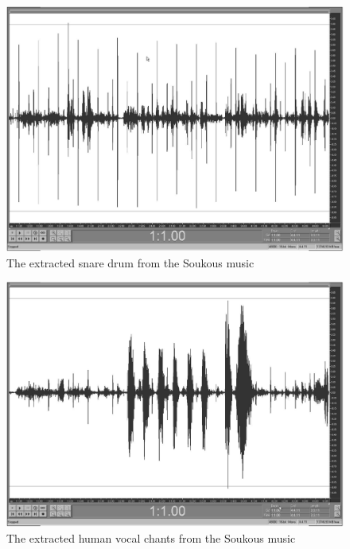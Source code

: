 \begin{landscape}
  \begin{figure}
    \centering
    \includegraphics[width=7in]{ZingZongExtractedSnare.pdf}
    \caption{The extracted snare drum from the Soukous music}
    \label{zingzongsnare}
  \end{figure}
\end{landscape}

\begin{landscape}
  \begin{figure}
    \centering
    \includegraphics[width=7in]{ZingZongExtractedVox.pdf}
    \caption{The extracted human vocal chants from the Soukous music}
    \label{zingzongvox}
  \end{figure}
\end{landscape}

